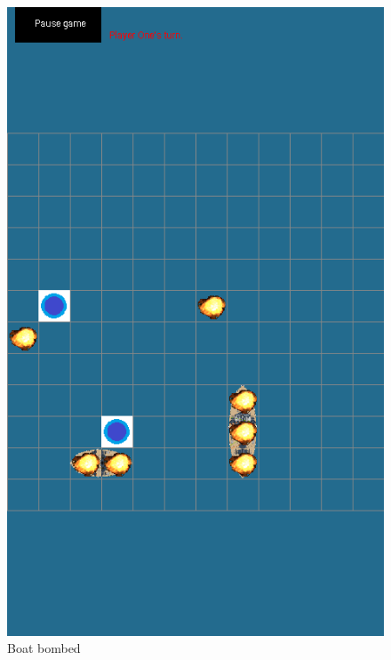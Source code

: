 \begin{figure}[ht]
\begin{minipage}[b]{0.325\linewidth}
		\includegraphics[scale=0.225]{img/Screenshot_bomb.png}
		\caption{Boat bombed}
		\label{fig:bomb}
	\end{minipage}
	\begin{minipage}[b]{0.325\linewidth}
		\centering

\end{minipage}
\end{figure}
